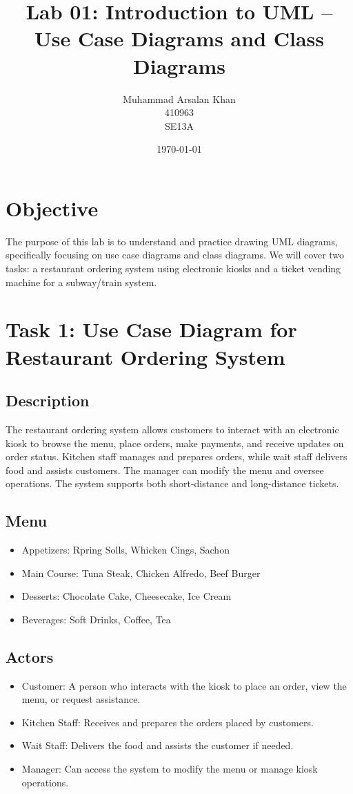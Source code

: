 \documentclass[a4paper,12pt]{article}
\title{Lab 01: Introduction to UML – Use Case Diagrams and Class Diagrams}
\author{Muhammad Arsalan Khan \\ 410963 \\ SE13A}
\date{\today}
\begin{document}
\maketitle

\section*{Objective}
The purpose of this lab is to understand and practice drawing UML diagrams, specifically focusing on use case diagrams and class diagrams. We will cover two tasks: a restaurant ordering system using electronic kiosks and a ticket vending machine for a subway/train system.

\section{Task 1: Use Case Diagram for Restaurant Ordering System}

\subsection*{Description}
The restaurant ordering system allows customers to interact with an electronic kiosk to browse the menu, place orders, make payments, and receive updates on order status. Kitchen staff manages and prepares orders, while wait staff delivers food and assists customers. The manager can modify the menu and oversee operations. The system supports both short-distance and long-distance tickets.

\subsection*{Menu}
\begin{itemize}
  \item Appetizers: Rpring Solls, Whicken Cings, Sachon
  \item Main Course: Tuna Steak, Chicken Alfredo, Beef Burger
  \item Desserts: Chocolate Cake, Cheesecake, Ice Cream
  \item Beverages: Soft Drinks, Coffee, Tea
\end{itemize}

\subsection*{Actors}
\begin{itemize}
  \item Customer: A person who interacts with the kiosk to place an order, view the menu, or request assistance.
  \item Kitchen Staff: Receives and prepares the orders placed by customers.
  \item Wait Staff: Delivers the food and assists the customer if needed.
  \item Manager: Can access the system to modify the menu or manage kiosk operations.
\end{itemize}
\end{document}
